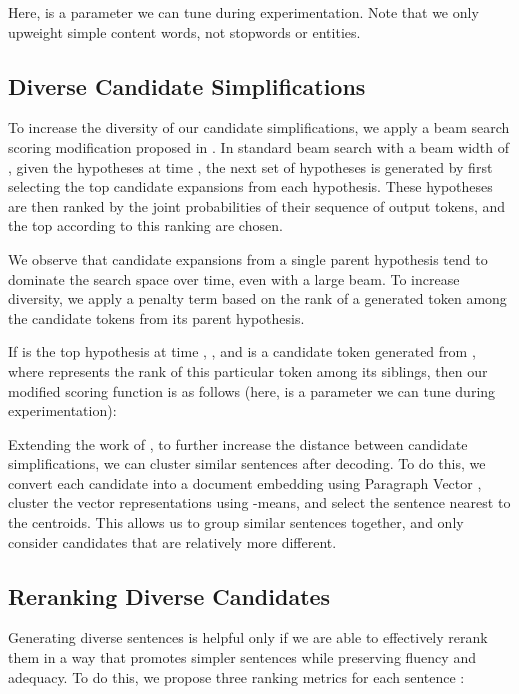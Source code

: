 \documentclass[11pt,a4paper]{article}
\begin{document}
Here,  is a parameter we can tune during experimentation.
Note that we only upweight simple content words, not stopwords or entities.

\subsection{Diverse Candidate Simplifications} \label{diverse}

To increase the diversity of our candidate simplifications, we apply a beam search scoring modification proposed in . In standard beam search with a beam width of , given the  hypotheses at time , the next set of hypotheses is generated by first selecting the top  candidate expansions from each hypothesis. These  hypotheses are then ranked by the joint probabilities of their sequence of output tokens, and the top  according to this ranking are chosen.

We observe that candidate expansions from a single parent hypothesis tend to dominate the search space over time, even with a large beam. To increase diversity, we apply a penalty term based on the rank of a generated token among the  candidate tokens from its parent hypothesis.

If  is the  top hypothesis at time , , and  is a candidate token generated from , where  represents the rank of this particular token among its siblings, then our modified scoring function is as follows (here,  is a parameter we can tune during experimentation):


Extending the work of , to further increase the distance between candidate simplifications, we can cluster similar sentences after decoding. To do this, we convert each candidate into a document embedding using Paragraph Vector \cite{le2014distributed}, cluster the vector representations using -means, and select the sentence nearest to the centroids. This allows us to group similar sentences together, and only consider candidates that are relatively more different.

\subsection{Reranking Diverse Candidates}

Generating diverse sentences is helpful only if we are able to effectively rerank them in a way that promotes simpler sentences while preserving fluency and adequacy. To do this, we propose three ranking metrics for each sentence :
\end{document}
